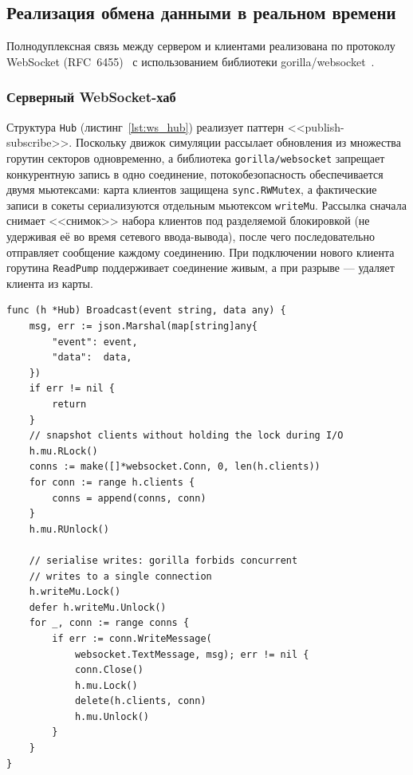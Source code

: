 \subsection{Реализация обмена данными в реальном времени}

Полнодуплексная связь между сервером и клиентами реализована
по протоколу WebSocket (RFC~6455)~\cite{rfc6455_ietf,mdn_websocket}
с использованием библиотеки
gorilla/websocket~\cite{gorilla_websocket_github,gorilla_websocket_pkgdev}.

\subsubsection{Серверный WebSocket-хаб}

Структура \texttt{Hub} (листинг~\ref{lst:ws_hub}) реализует
паттерн <<publish-subscribe>>. Поскольку движок симуляции
рассылает обновления из множества горутин секторов
одновременно, а библиотека \texttt{gorilla/websocket}
запрещает конкурентную запись в одно соединение,
потокобезопасность обеспечивается двумя мьютексами: карта
клиентов защищена \texttt{sync.RWMutex}, а фактические записи
в сокеты сериализуются отдельным мьютексом
\texttt{writeMu}. Рассылка сначала снимает <<снимок>> набора
клиентов под разделяемой блокировкой (не удерживая её во время
сетевого ввода-вывода), после чего последовательно
отправляет сообщение каждому соединению. При подключении
нового клиента горутина \texttt{ReadPump} поддерживает
соединение живым, а при разрыве --- удаляет клиента из карты.

\begin{lstlisting}[caption={WebSocket-хаб: широковещательная рассылка (ws/hub.go)}, label={lst:ws_hub}]
func (h *Hub) Broadcast(event string, data any) {
    msg, err := json.Marshal(map[string]any{
        "event": event,
        "data":  data,
    })
    if err != nil {
        return
    }
    // snapshot clients without holding the lock during I/O
    h.mu.RLock()
    conns := make([]*websocket.Conn, 0, len(h.clients))
    for conn := range h.clients {
        conns = append(conns, conn)
    }
    h.mu.RUnlock()

    // serialise writes: gorilla forbids concurrent
    // writes to a single connection
    h.writeMu.Lock()
    defer h.writeMu.Unlock()
    for _, conn := range conns {
        if err := conn.WriteMessage(
            websocket.TextMessage, msg); err != nil {
            conn.Close()
            h.mu.Lock()
            delete(h.clients, conn)
            h.mu.Unlock()
        }
    }
}
\end{lstlisting}

